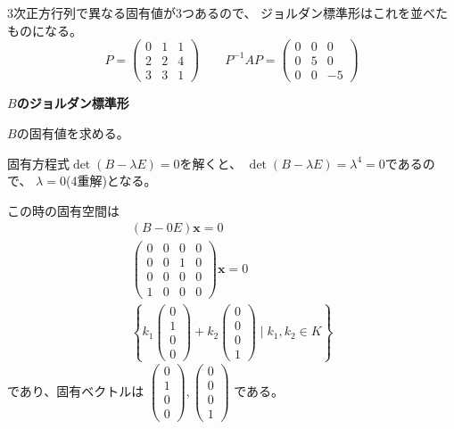 \documentclass[12pt,b5paper]{ltjsarticle}
\begin{document}
\begin{enumerate}
      3次正方行列で異なる固有値が3つあるので、
      ジョルダン標準形はこれを並べたものになる。
      \begin{equation}
       P=
        \begin{pmatrix}0&1&1\\2&2&4\\3&3&1\end{pmatrix}
        \qquad
         P^{-1}AP=
         \begin{pmatrix}0&0&0\\0&5&0\\0&0&-5\end{pmatrix}
      \end{equation}


      \textbf{$B$のジョルダン標準形}

      $B$の固有値を求める。

      固有方程式$\det(B-\lambda E) =0$を解くと、
      $\det(B-\lambda E) = \lambda^4=0$であるので、
      $\lambda=0$(4重解)となる。

      この時の固有空間は
      \begin{gather}
       (B-0 E)\bm{x}=0\\
       \begin{pmatrix}
        0&0&0&0\\0&0&1&0\\0&0&0&0\\1&0&0&0
       \end{pmatrix}
       \bm{x}=0\\
       \left\{
       k_1 \begin{pmatrix}0\\1\\0\\0\end{pmatrix}
       + k_2 \begin{pmatrix}0\\0\\0\\1\end{pmatrix}
       \mid k_1,k_2 \in K
       \right\}
      \end{gather}
      であり、固有ベクトルは
      $\begin{pmatrix}0\\1\\0\\0\end{pmatrix},\begin{pmatrix}0\\0\\0\\1\end{pmatrix}$
      である。


\end{enumerate}
\end{document}
